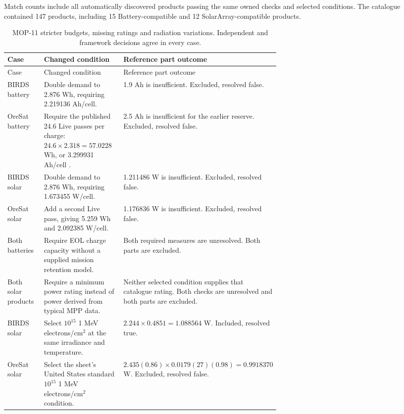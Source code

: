 Match counts include all automatically discovered products passing the same owned checks and selected conditions.
The catalogue contained 147 products, including 15 Battery-compatible and 12 SolarArray-compatible products.

\begingroup\footnotesize\setlength{\tabcolsep}{3pt}\setlength{\parskip}{0pt}
\begin{longtable}{@{}P{0.22\linewidth}P{0.42\linewidth}P{\tabcolsep\relax}@{}}
\caption{MOP-11 stricter budgets, missing ratings and radiation variations. Independent and framework decisions agree in every case.}\label{tab:cots-case-controls}\\
\toprule
Case & Changed condition & Reference part outcome \\ \midrule
\endfirsthead
\toprule
Case & Changed condition & Reference part outcome \\ \midrule
\endhead
\bottomrule\endfoot
BIRDS battery & Double demand to 2.876 Wh, requiring 2.219136 Ah/cell. & 1.9 Ah is insufficient. Excluded, resolved false. \\
OreSat battery & Require the published 24.6 Live passes per charge: $24.6\times2.318=57.0228$ Wh, or 3.299931 Ah/cell \citep[p.~2]{oresat2019powerbudget}. & 2.5 Ah is insufficient for the earlier reserve. Excluded, resolved false. \\
BIRDS solar & Double demand to 2.876 Wh, requiring 1.673455 W/cell. & 1.211486 W is insufficient. Excluded, resolved false. \\
OreSat solar & Add a second Live pass, giving 5.259 Wh and 2.092385 W/cell. & 1.176836 W is insufficient. Excluded, resolved false. \\
Both batteries & Require EOL charge capacity without a supplied mission retention model. & Both required measures are unresolved. Both parts are excluded. \\
Both solar products & Require a minimum power rating instead of power derived from typical MPP data. & Neither selected condition supplies that catalogue rating. Both checks are unresolved and both parts are excluded. \\
BIRDS solar & Select $10^{15}$ 1 MeV electrons/cm$^2$ at the same irradiance and temperature. & $2.244\times0.4851=1.088564$ W. Included, resolved true. \\
OreSat solar & Select the sheet's United States standard $10^{15}$ 1 MeV electrons/cm$^2$ condition. & $2.435(0.86)\times0.0179(27)(0.98)=0.9918370$ W. Excluded, resolved false. \\
\end{longtable}\endgroup

